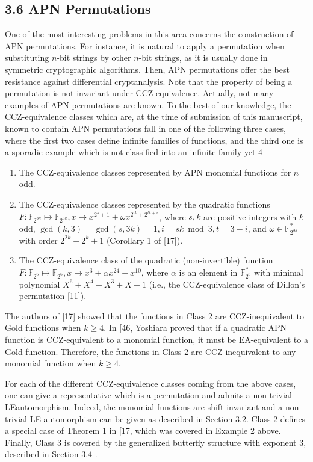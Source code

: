 \documentclass[10pt]{article}
\begin{document}
\subsection*{3.6 APN Permutations}
One of the most interesting problems in this area concerns the construction of APN permutations. For instance, it is natural to apply a permutation when substituting $n$-bit strings by other $n$-bit strings, as it is usually done in symmetric cryptographic algorithms. Then, APN permutations offer the best resistance against differential cryptanalysis. Note that the property of being a permutation is not invariant under CCZ-equivalence. Actually, not many examples of APN permutations are known. To the best of our knowledge, the CCZ-equivalence classes which are, at the time of submission of this manuscript, known to contain APN permutations fall in one of the following three cases, where the first two cases define infinite families of functions, and the third one is a sporadic example which is not classified into an infinite family yet 4

\begin{enumerate}
  \item The CCZ-equivalence classes represented by APN monomial functions for $n$ odd.
  \item The CCZ-equivalence classes represented by the quadratic functions $F: \mathbb{F}_{2^{3 k}} \mapsto \mathbb{F}_{2^{3 k}}, x \mapsto x^{2^{s}+1}+\omega x^{2^{i k}+2^{t k+s}}$, where $s, k$ are positive integers with $k$ odd, $\operatorname{gcd}(k, 3)= \operatorname{gcd}(s, 3 k)=1, i=s k \bmod 3, t=3-i$, and $\omega \in \mathbb{F}_{2^{3 k}}^{*}$ with order $2^{2 k}+2^{k}+1$ (Corollary 1 of [17]).
  \item The CCZ-equivalence class of the quadratic (non-invertible) function $F: \mathbb{F}_{2^{6}} \mapsto \mathbb{F}_{2^{6}}, x \mapsto x^{3}+\alpha x^{24}+x^{10}$, where $\alpha$ is an element in $\mathbb{F}_{2^{6}}^{*}$ with minimal polynomial $X^{6}+X^{4}+X^{3}+X+1$ (i.e., the CCZ-equivalence class of Dillon's permutation [11]).
\end{enumerate}

The authors of [17] showed that the functions in Class 2 are CCZ-inequivalent to Gold functions when $k \geq 4$. In [46, Yoshiara proved that if a quadratic APN function is CCZ-equivalent to a monomial function, it must be EA-equivalent to a Gold function. Therefore, the functions in Class 2 are CCZ-inequivalent to any monomial function when $k \geq 4$.

For each of the different CCZ-equivalence classes coming from the above cases, one can give a representative which is a permutation and admits a non-trivial LEautomorphism. Indeed, the monomial functions are shift-invariant and a non-trivial LE-automorphism can be given as described in Section 3.2. Class 2 defines a special case of Theorem 1 in [17, which was covered in Example 2 above. Finally, Class 3 is covered by the generalized butterfly structure with exponent 3, described in Section 3.4 .
\end{document}
